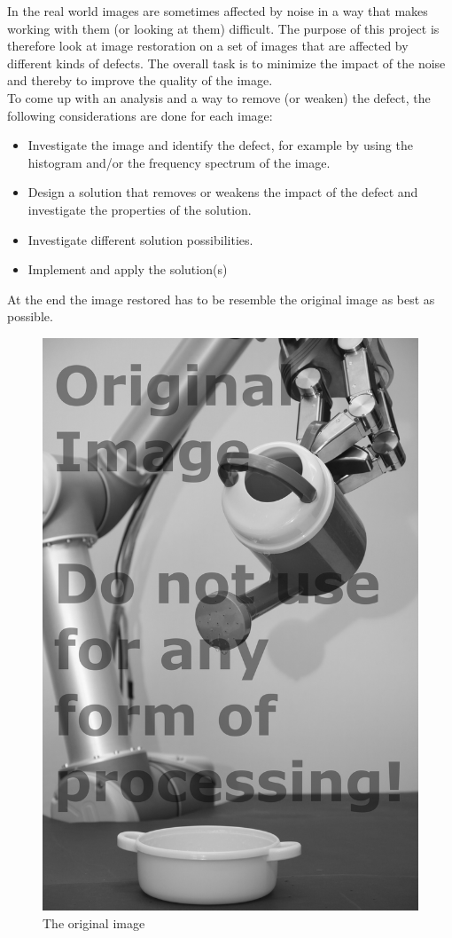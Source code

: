 In the real world images are sometimes affected by noise in a way that makes working with them (or looking at them) difficult. The purpose of this project is therefore look at image restoration on a set of images that are affected by different kinds of defects. The overall task is to minimize the impact of the noise and thereby to improve the quality of the image.\\[0.2cm]
To come up with an analysis and a way to remove (or weaken) the defect, the following considerations are done for each image: 
\begin{itemize}\itemsep-3pt
\item Investigate the image and identify the defect, for example by using the histogram and/or the frequency spectrum of the image.
\item Design a solution that removes or weakens the impact of the defect and investigate the properties of the solution. 
\item Investigate different solution possibilities.
\item Implement and apply the solution(s)
\end{itemize}

At the end the image restored has to be resemble the original image as best as possible. 

\begin{figure}[H]
\centering
        \includegraphics[scale= 0.15]{org.png}
        \caption{The original image}
        \label{fig:orignal}
\end{figure}

